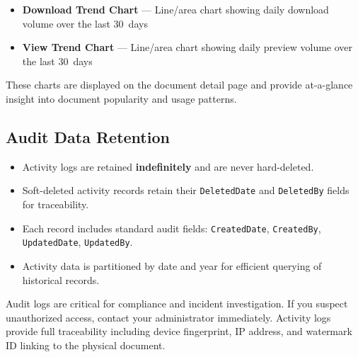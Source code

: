 \begin{itemize}[leftmargin=18pt]
  \item \textbf{Download Trend Chart} --- Line/area chart
        showing daily download volume over the last 30~days
  \item \textbf{View Trend Chart} --- Line/area chart
        showing daily preview volume over the last 30~days
\end{itemize}

These charts are displayed on the document detail page and
provide at-a-glance insight into document popularity and
usage patterns.

\subsection{Audit Data Retention}

\begin{itemize}[leftmargin=18pt]
  \item Activity logs are retained \textbf{indefinitely} and
        are never hard-deleted.
  \item Soft-deleted activity records retain their
        \texttt{DeletedDate} and \texttt{DeletedBy} fields
        for traceability.
  \item Each record includes standard audit fields:
        \texttt{CreatedDate}, \texttt{CreatedBy},
        \texttt{UpdatedDate}, \texttt{UpdatedBy}.
  \item Activity data is partitioned by date and year for
        efficient querying of historical records.
\end{itemize}

\begin{ugWarning}
  Audit logs are critical for compliance and incident
  investigation. If you suspect unauthorized access, contact
  your administrator immediately. Activity logs provide full
  traceability including device fingerprint, IP address, and
  watermark ID linking to the physical document.
\end{ugWarning}

\newpage
